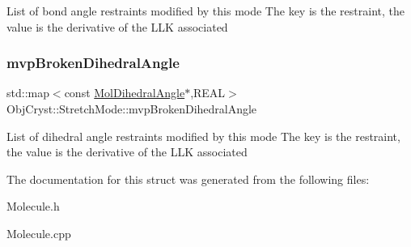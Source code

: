 List of bond angle restraints modified by this mode The key is the restraint, the value is the derivative of the L\+LK associated \mbox{\label{struct_obj_cryst_1_1_stretch_mode_a84257bc829a3d612b68046d33685e59e}} 
\subsubsection{\texorpdfstring{mvpBrokenDihedralAngle}{mvpBrokenDihedralAngle}}
{\footnotesize\ttfamily std\+::map$<$const \mbox{\hyperlink{class_obj_cryst_1_1_mol_dihedral_angle}{Mol\+Dihedral\+Angle}}$\ast$,R\+E\+AL$>$ Obj\+Cryst\+::\+Stretch\+Mode\+::mvp\+Broken\+Dihedral\+Angle}

List of dihedral angle restraints modified by this mode The key is the restraint, the value is the derivative of the L\+LK associated 

The documentation for this struct was generated from the following files\+:\begin{DoxyCompactItemize}
\item 
Molecule.\+h\item 
Molecule.\+cpp\end{DoxyCompactItemize}
